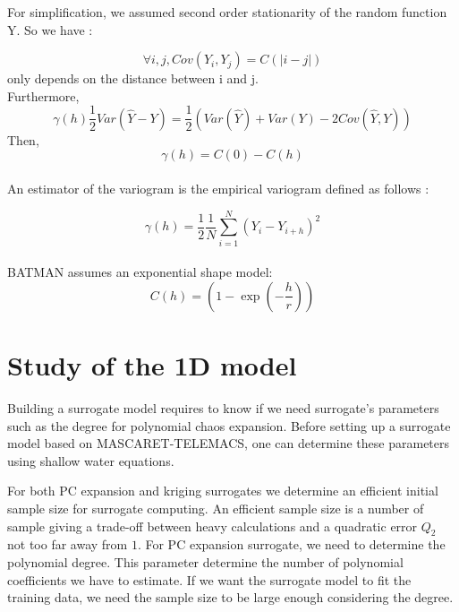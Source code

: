 \documentclass[hidelinks,12pt]{article}
\begin{document}
For simplification, we assumed second order stationarity of the random function Y. So we have :

$$\forall i,j, Cov(Y_i,Y_{j})=C(|i-j|)$$ only depends on the distance between i and j.
\\
Furthermore, $$\gamma(h)\frac{1}{2}Var(\hat{Y}-Y)=\frac{1}{2}(Var(\hat{Y})+Var(Y)-2Cov(\hat{Y},Y))$$
Then,$$\gamma(h)=C(0)-C(h)$$
\\
An estimator of the variogram is the empirical variogram defined as follows :

$$\gamma(h)=\frac{1}{2} \frac{1}{N} \sum_{i=1}^{N} (Y_i - Y_{i+h})^2$$
\\
BATMAN assumes an exponential shape model: 
$$C(h)=\left(1- \exp{\left(-\frac{h}{r}\right)}\right)$$





\section{Study of the 1D model}

Building a surrogate model requires to know if we need surrogate's parameters such as the degree for polynomial chaos expansion. Before setting up a surrogate model based on MASCARET-TELEMACS, one can determine these parameters using shallow water equations.

For both PC expansion and kriging surrogates we determine an efficient initial sample size for surrogate computing. An efficient sample size is a number of sample giving a trade-off between heavy calculations and a quadratic error $Q_2$ not too far away from $1$. For PC expansion surrogate, we need to determine the polynomial degree. This parameter determine the number of polynomial coefficients we have to estimate. If we want the surrogate model to fit the training data, we need the sample size to be large enough considering the degree.




\end{document}
